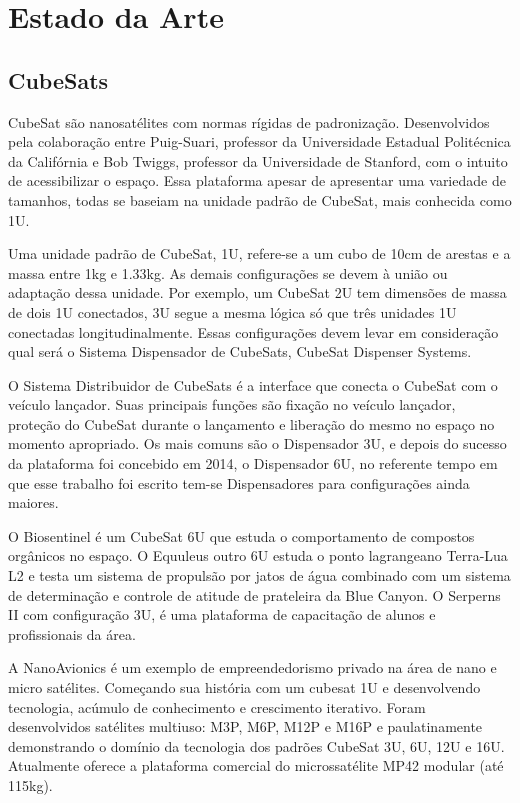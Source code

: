\chapter{Estado da Arte}\label{cap:Estadp da Arte}
\section{CubeSats}\label{sec:CubeSats}
CubeSat são nanosatélites com normas rígidas de padronização. Desenvolvidos pela colaboração entre Puig-Suari, professor da Universidade Estadual Politécnica da Califórnia e Bob Twiggs, professor da Universidade de Stanford, com o intuito de acessibilizar o espaço. Essa plataforma apesar de apresentar uma variedade de tamanhos, todas se baseiam na unidade padrão de CubeSat, mais conhecida como 1U.

Uma unidade padrão de CubeSat, 1U, refere-se a um cubo de 10cm de arestas e a massa entre 1kg e 1.33kg. As demais configurações se devem à união ou adaptação dessa unidade. Por exemplo, um CubeSat 2U tem dimensões de massa de dois 1U conectados, 3U segue a mesma lógica só que três unidades 1U conectadas longitudinalmente. Essas configurações devem levar em consideração qual será o Sistema Dispensador de CubeSats, CubeSat Dispenser Systems.

O Sistema Distribuidor de CubeSats é a interface que conecta o CubeSat com o veículo lançador. Suas principais funções são fixação no veículo lançador, proteção do CubeSat durante o lançamento e liberação do mesmo no espaço no momento apropriado. Os mais comuns são o Dispensador 3U, e depois do sucesso da plataforma foi concebido em 2014, o Dispensador 6U, no referente tempo em que esse trabalho foi escrito tem-se Dispensadores para configurações ainda maiores.

O Biosentinel é um CubeSat 6U que estuda o comportamento de compostos orgânicos no espaço.  O Equuleus outro 6U estuda o ponto lagrangeano Terra-Lua L2 e testa um sistema de propulsão por jatos de água combinado com um sistema de determinação e controle de atitude de prateleira da Blue Canyon. O Serperns II com configuração 3U, é uma plataforma de capacitação de alunos e profissionais da área.

A NanoAvionics é um exemplo de empreendedorismo privado na área de nano e micro satélites. Começando sua história com um cubesat 1U e desenvolvendo tecnologia, acúmulo de conhecimento e crescimento iterativo. Foram desenvolvidos satélites multiuso: M3P, M6P, M12P e M16P e paulatinamente demonstrando o domínio da tecnologia dos padrões CubeSat 3U, 6U, 12U e 16U. Atualmente  oferece a plataforma comercial  do microssatélite MP42 modular (até 115kg).

